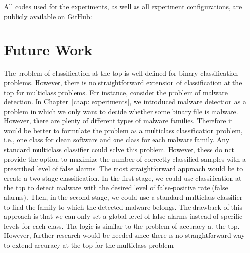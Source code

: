 \noindent All codes used for the experiments, as well as all experiment configurations, are publicly available on GitHub:
\github

\section*{Future Work}

The problem of classification at the top is well-defined for binary classification problems. However, there is no straightforward extension of classification at the top for multiclass problems. For instance, consider the problem of malware detection. In Chapter~\ref{chap: experiments}, we introduced malware detection as a problem in which we only want to decide whether some binary file is malware. However, there are plenty of different types of malware families. Therefore it would be better to formulate the problem as a multiclass classification problem, i.e., one class for clean software and one class for each malware family. Any standard multiclass classifier could solve this problem. However, these do not provide the option to maximize the number of correctly classified samples with a prescribed level of false alarms. The most straightforward approach would be to create a two-stage classification. In the first stage, we could use classification at the top to detect malware with the desired level of false-positive rate (false alarms). Then, in the second stage, we could use a standard multiclass classifier to find the family to which the detected malware belongs. The drawback of this approach is that we can only set a global level of false alarms instead of specific levels for each class. The logic is similar to the problem of accuracy at the top. However, further research would be needed since there is no straightforward way to extend accuracy at the top for the multiclass problem.
